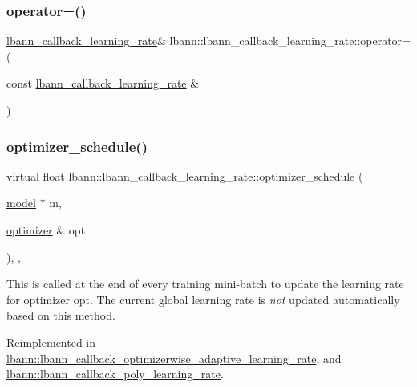 \subsubsection{\texorpdfstring{operator=()}{operator=()}}
{\footnotesize\ttfamily \hyperlink{classlbann_1_1lbann__callback__learning__rate}{lbann\+\_\+callback\+\_\+learning\+\_\+rate}\& lbann\+::lbann\+\_\+callback\+\_\+learning\+\_\+rate\+::operator= (\begin{DoxyParamCaption}\item[{const \hyperlink{classlbann_1_1lbann__callback__learning__rate}{lbann\+\_\+callback\+\_\+learning\+\_\+rate} \&}]{ }\end{DoxyParamCaption})\hspace{0.3cm}{\ttfamily [default]}}

\mbox{\label{classlbann_1_1lbann__callback__learning__rate_acf7f3921a68e7f1f772106e18c545345}} 
\subsubsection{\texorpdfstring{optimizer\+\_\+schedule()}{optimizer\_schedule()}}
{\footnotesize\ttfamily virtual float lbann\+::lbann\+\_\+callback\+\_\+learning\+\_\+rate\+::optimizer\+\_\+schedule (\begin{DoxyParamCaption}\item[{\hyperlink{classlbann_1_1model}{model} $\ast$}]{m,  }\item[{\hyperlink{classlbann_1_1optimizer}{optimizer} \&}]{opt }\end{DoxyParamCaption})\hspace{0.3cm}{\ttfamily [inline]}, {\ttfamily [protected]}, {\ttfamily [virtual]}}

This is called at the end of every training mini-\/batch to update the learning rate for optimizer opt. The current global learning rate is {\itshape not} updated automatically based on this method. 

Reimplemented in \hyperlink{classlbann_1_1lbann__callback__optimizerwise__adaptive__learning__rate_aa9ce00b0ad1fefb20a1108d1120e82d5}{lbann\+::lbann\+\_\+callback\+\_\+optimizerwise\+\_\+adaptive\+\_\+learning\+\_\+rate}, and \hyperlink{classlbann_1_1lbann__callback__poly__learning__rate_a55414af733e519be126572ec92492bf7}{lbann\+::lbann\+\_\+callback\+\_\+poly\+\_\+learning\+\_\+rate}.



